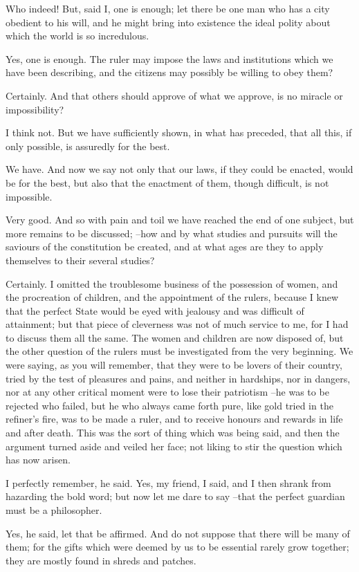 Who indeed!
But, said I, one is enough; let there be one man who has a city obedient to his will, and he might bring into existence the ideal polity about which the world is so incredulous.

Yes, one is enough.
The ruler may impose the laws and institutions which we have been describing, and the citizens may possibly be willing to obey them?

Certainly.
And that others should approve of what we approve, is no miracle or impossibility?

I think not.
But we have sufficiently shown, in what has preceded, that all this, if only possible, is assuredly for the best.

We have.
And now we say not only that our laws, if they could be enacted, would be for the best, but also that the enactment of them, though difficult, is not impossible.

Very good.
And so with pain and toil we have reached the end of one subject, but more remains to be discussed; --how and by what studies and pursuits will the saviours of the constitution be created, and at what ages are they to apply themselves to their several studies?

Certainly.
I omitted the troublesome business of the possession of women, and the procreation of children, and the appointment of the rulers, because I knew that the perfect State would be eyed with jealousy and was difficult of attainment; but that piece of cleverness was not of much service to me, for I had to discuss them all the same. The women and children are now disposed of, but the other question of the rulers must be investigated from the very beginning. We were saying, as you will remember, that they were to be lovers of their country, tried by the test of pleasures and pains, and neither in hardships, nor in dangers, nor at any other critical moment were to lose their patriotism --he was to be rejected who failed, but he who always came forth pure, like gold tried in the refiner's fire, was to be made a ruler, and to receive honours and rewards in life and after death. This was the sort of thing which was being said, and then the argument turned aside and veiled her face; not liking to stir the question which has now arisen.

I perfectly remember, he said.
Yes, my friend, I said, and I then shrank from hazarding the bold word; but now let me dare to say --that the perfect guardian must be a philosopher.

Yes, he said, let that be affirmed.
And do not suppose that there will be many of them; for the gifts which were deemed by us to be essential rarely grow together; they are mostly found in shreds and patches.

